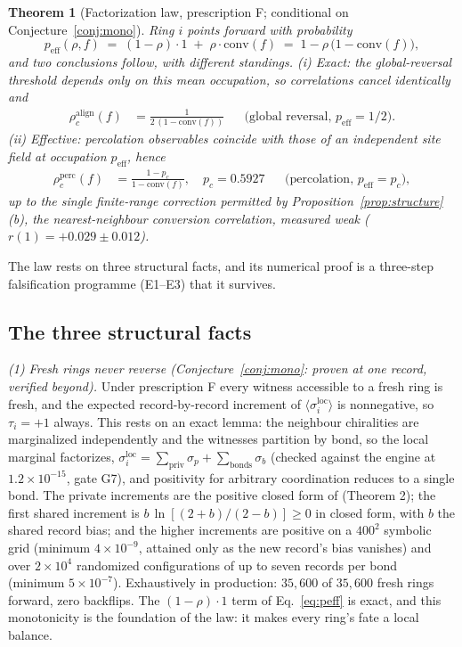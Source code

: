 \documentclass[11pt]{article}
\newtheorem{theorem}{Theorem}
\newcommand{\peff}{p_{\mathrm{eff}}}
\newcommand{\conv}{\mathrm{conv}}
\newcommand{\rhoalign}{\rho_c^{\mathrm{align}}}
\newcommand{\rhoperc}{\rho_c^{\mathrm{perc}}}
\begin{document}
\begin{theorem}[Factorization law, prescription F; conditional on
Conjecture~\ref{conj:mono}]
\label{thm:factorization}
Ring $i$ points forward with probability
%
\begin{equation}
\peff(\rho, f) \;=\; (1-\rho)\cdot 1 \;+\; \rho\cdot \conv(f)
\;=\; 1 - \rho\,\big(1 - \conv(f)\big),
\label{eq:peff}
\end{equation}
%
and two conclusions follow, with different standings. (i) Exact: the
global-reversal threshold depends only on this mean occupation, so
correlations cancel identically and
%
\begin{align}
\rhoalign(f) &= \frac{1}{2\,(1-\conv(f))}
&&\text{(global reversal, } \peff = 1/2\text{)}.
\label{eq:rhoalign}
\end{align}
%
(ii) Effective: percolation observables coincide with those of an
independent site field at occupation $\peff$, hence
%
\begin{align}
\rhoperc(f) &= \frac{1-p_c}{1-\conv(f)}, \quad p_c = 0.5927
&&\text{(percolation, } \peff = p_c\text{)},
\label{eq:rhoperc}
\end{align}
%
up to the single finite-range correction permitted by
Proposition~\ref{prop:structure}(b), the nearest-neighbour conversion
correlation, measured weak ($r(1) = +0.029 \pm 0.012$).
\end{theorem}

The law rests on three structural facts, and its numerical proof is a
three-step falsification programme (E1--E3) that it survives.

\subsection{The three structural facts}

\emph{(1) Fresh rings never reverse (Conjecture~\ref{conj:mono}:
proven at one record, verified beyond).} Under
prescription F every witness accessible to a fresh ring is fresh, and the
expected record-by-record increment of
$\langle\sigma_i^{\mathrm{loc}}\rangle$ is nonnegative, so $\tau_i = +1$
always. This rests on an exact lemma: the neighbour chiralities are
marginalized independently and the witnesses partition by bond, so the
local marginal factorizes,
$\sigma_i^{\mathrm{loc}} = \sum_{\mathrm{priv}} \sigma_p +
\sum_{\mathrm{bonds}} \sigma_b$ (checked against the engine at
$1.2\times 10^{-15}$, gate G7), and positivity for arbitrary coordination reduces to a
single bond. The private increments are the positive closed form of
\cite{p1} (Theorem 2); the first shared increment is
$b\,\ln[(2+b)/(2-b)] \ge 0$ in closed form, with $b$ the shared record
bias; and the higher increments are positive on a $400^2$ symbolic grid
(minimum $4\times 10^{-9}$, attained only as the new record's bias
vanishes) and over $2\times 10^4$ randomized configurations of up to seven
records per bond (minimum $5\times 10^{-7}$). Exhaustively in production:
$35{,}600$ of $35{,}600$ fresh rings forward, zero backflips. The
$(1-\rho)\cdot 1$ term of Eq.~\eqref{eq:peff} is exact, and this
monotonicity is the foundation of the law: it makes every ring's fate a
local balance.
\end{document}

